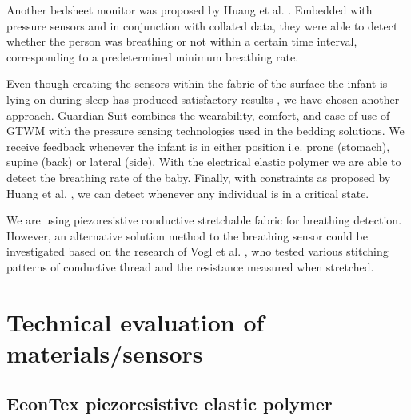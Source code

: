 \documentclass{sigchi-ext}
\begin{document}
Another bedsheet monitor was proposed by Huang et al. \cite{a18-huang}. Embedded with pressure sensors and in conjunction with collated data, they were able to detect whether the person was breathing or not within a certain time interval, corresponding to a predetermined minimum breathing rate.

Even though creating the sensors within the fabric of the surface the infant is lying on during sleep has produced satisfactory results \cite{a18-huang, a33-kroutil}, we have chosen another approach. Guardian Suit combines the wearability, comfort, and ease of use of GTWM
\cite{p285-fantauzzacoffin} with the pressure sensing technologies used in the bedding solutions. We receive feedback whenever the infant is in either position i.e. prone (stomach), supine (back) or lateral (side). With the electrical elastic polymer we are able to detect the breathing rate of the baby. Finally, with constraints as proposed by Huang et al. \cite{a18-huang}, we can detect whenever any individual is in a critical state.

We are using piezoresistive conductive
stretchable fabric for breathing detection. However, an alternative solution method to the breathing sensor
could be investigated based on the research of Vogl et al. \cite{stretcheband}, who
tested various stitching patterns of conductive thread and the resistance measured
when stretched.

\clearpage

\section{Technical evaluation of materials/sensors}

\subsection{EeonTex piezoresistive elastic polymer}
\end{document}

